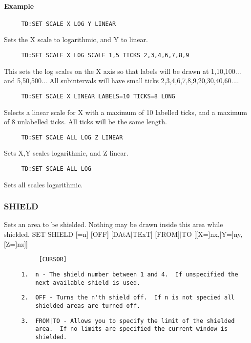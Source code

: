\paragraph{Example   }
\begin{verbatim}
     TD:SET SCALE X LOG Y LINEAR 
\end{verbatim}
Sets the X scale to logarithmic, and Y to linear.  
\begin{verbatim}
     TD:SET SCALE X LOG SCALE 1,5 TICKS 2,3,4,6,7,8,9 
\end{verbatim}
This  sets  the log scales on the X axis so that labels will be drawn
at 1,10,100...  and 5,50,500...  All  subintervals  will  have  small
ticks 2,3,4,6,7,8,9,20,30,40,60....  
\begin{verbatim}
     TD:SET SCALE X LINEAR LABELS=10 TICKS=8 LONG 
\end{verbatim}
Selects a linear scale for X with a maximum of 10 labelled ticks, and
a maximum of 8 unlabelled ticks.  All ticks will be the same length. 
\begin{verbatim}
     TD:SET SCALE ALL LOG Z LINEAR 
\end{verbatim}
Sets X,Y scales logarithmic, and Z linear.  
\begin{verbatim}
     TD:SET SCALE ALL LOG 
\end{verbatim}
Sets all scales logarithmic.  
\subsubsection{SHIELD}
Sets  an  area  to  be shielded.  Nothing may be drawn inside this area
while shielded.  
SET SHIELD [=n] [OFF] [DAtA$|$TExT] [FROM]$|$TO [[X=]nx,[Y=]ny,[Z=]nz]]
\begin{verbatim}
          [CURSOR] 
\end{verbatim}

\begin{verbatim}
     1.  n - The shield number between 1 and 4.  If unspecified the
         next available shield is used.  
\end{verbatim}

\begin{verbatim}
     2.  OFF - Turns the n'th shield off.  If n is not specied all
         shielded areas are turned off.  
\end{verbatim}

\begin{verbatim}
     3.  FROM|TO - Allows you to specify the limit of the shielded
         area.  If no limits are specified the current window is
         shielded.  
\end{verbatim}

